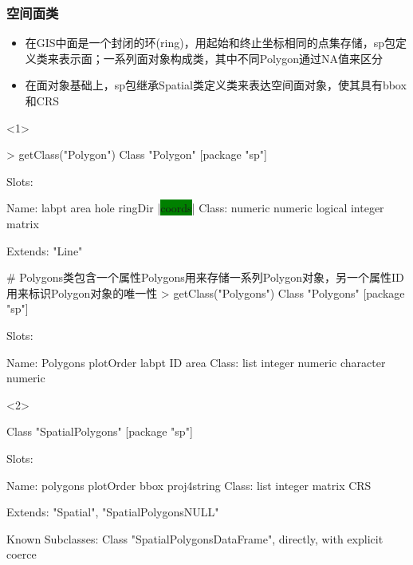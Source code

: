 \subsubsection{空间面类}
\begin{frame}[t,fragile]{\subsecname}{\subsubsecname}
\begin{itemize}
\item<1-> 在GIS中面是一个封闭的环(ring)，用起始和终止坐标相同的点集存储，sp包定义类来表示面；一系列面对象构成类，其中不同Polygon通过NA值来区分
\item<2-> 在面对象基础上，sp包继承Spatial类定义类来表达空间面对象，使其具有bbox和CRS
\end{itemize}

\begin{overlayarea}{\textwidth}{\textheight}
\begin{onlyenv}<1>
\begin{rcode}
> getClass("Polygon")
Class "Polygon" [package "sp"]

Slots:
                                              
Name:    labpt    area    hole ringDir  |\colorbox{green}{coords}|
Class: numeric numeric logical integer  matrix

Extends: "Line"

# Polygons类包含一个属性Polygons用来存储一系列Polygon对象，另一个属性ID用来标识Polygon对象的唯一性
> getClass("Polygons")
Class "Polygons" [package "sp"]

Slots:
                                                        
Name:   Polygons plotOrder     labpt        ID      area
Class:      list   integer   numeric character   numeric
\end{rcode}
\end{onlyenv}

\begin{onlyenv}<2>
\begin{rcode}
Class "SpatialPolygons" [package "sp"]

Slots:
                                                      
Name:     polygons   plotOrder        bbox proj4string
Class:        list     integer      matrix         CRS

Extends: "Spatial", "SpatialPolygonsNULL"

Known Subclasses: 
Class "SpatialPolygonsDataFrame", directly, with explicit coerce
\end{rcode}
\end{onlyenv}
\end{overlayarea}
\end{frame}

